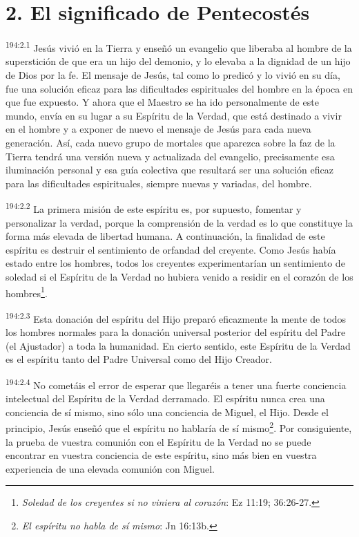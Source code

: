 \section*{2. El significado de Pentecostés}
\par 
\textsuperscript{194:2.1} Jesús vivió en la Tierra y enseñó un evangelio que liberaba al hombre de la superstición de que era un hijo del demonio, y lo elevaba a la dignidad de un hijo de Dios por la fe. El mensaje de Jesús, tal como lo predicó y lo vivió en su día, fue una solución eficaz para las dificultades espirituales del hombre en la época en que fue expuesto. Y ahora que el Maestro se ha ido personalmente de este mundo, envía en su lugar a su Espíritu de la Verdad, que está destinado a vivir en el hombre y a exponer de nuevo el mensaje de Jesús para cada nueva generación. Así, cada nuevo grupo de mortales que aparezca sobre la faz de la Tierra tendrá una versión nueva y actualizada del evangelio, precisamente esa iluminación personal y esa guía colectiva que resultará ser una solución eficaz para las dificultades espirituales, siempre nuevas y variadas, del hombre.

\par 
\textsuperscript{194:2.2} La primera misión de este espíritu es, por supuesto, fomentar y personalizar la verdad, porque la comprensión de la verdad es lo que constituye la forma más elevada de libertad humana. A continuación, la finalidad de este espíritu es destruir el sentimiento de orfandad del creyente. Como Jesús había estado entre los hombres, todos los creyentes experimentarían un sentimiento de soledad si el Espíritu de la Verdad no hubiera venido a residir en el corazón de los hombres\footnote{\textit{Soledad de los creyentes si no viniera al corazón}: Ez 11:19; 36:26-27.}.

\par 
\textsuperscript{194:2.3} Esta donación del espíritu del Hijo preparó eficazmente la mente de todos los hombres normales para la donación universal posterior del espíritu del Padre (el Ajustador) a toda la humanidad. En cierto sentido, este Espíritu de la Verdad es el espíritu tanto del Padre Universal como del Hijo Creador.

\par 
\textsuperscript{194:2.4} No cometáis el error de esperar que llegaréis a tener una fuerte conciencia intelectual del Espíritu de la Verdad derramado. El espíritu nunca crea una conciencia de sí mismo, sino sólo una conciencia de Miguel, el Hijo. Desde el principio, Jesús enseñó que el espíritu no hablaría de sí mismo\footnote{\textit{El espíritu no habla de sí mismo}: Jn 16:13b.}. Por consiguiente, la prueba de vuestra comunión con el Espíritu de la Verdad no se puede encontrar en vuestra conciencia de este espíritu, sino más bien en vuestra experiencia de una elevada comunión con Miguel.


